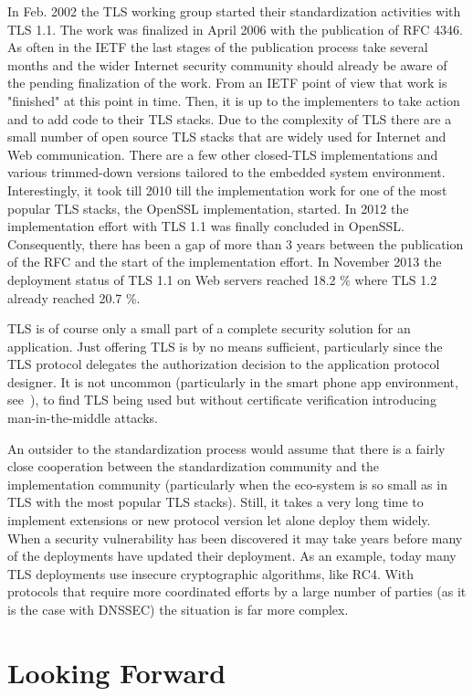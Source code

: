 \documentclass[peerreview, a4paper, 7pt]{IEEEtran}
\begin{document}
In Feb. 2002 the TLS working group started their standardization activities with TLS 1.1. The work was finalized in April 2006 with the publication of RFC 4346. As often in the IETF the last stages of the publication process take several months and the wider Internet security community should already be aware of the pending finalization of the work. From an IETF point of view that work is "finished" at this point in time. Then, it is up to the implementers to take action and to add code to their TLS stacks. Due to the complexity of TLS there are a small number of open source TLS stacks that are widely used for Internet and Web communication. There are a few other closed-TLS implementations and various trimmed-down versions tailored to the embedded system environment. Interestingly, it took till 2010 till the implementation work for one of the most popular TLS stacks, the OpenSSL implementation, started. In 2012 the implementation effort with TLS 1.1 was finally concluded in OpenSSL. Consequently, there has been a gap of more than 3 years between the publication of the RFC and the start of the implementation effort. In November 2013 the deployment status of TLS 1.1 on Web servers reached 18.2 \% where TLS 1.2 already reached 20.7 \%. 

TLS is of course only a small part of a complete security solution for an application. Just offering TLS is by no means sufficient, particularly since the TLS protocol delegates the authorization decision to the application protocol designer. It is not uncommon (particularly in the smart phone app environment, see~\cite{GI+02}), to find TLS being used but without certificate verification introducing man-in-the-middle attacks. 

An outsider to the standardization process would assume that there is a fairly close cooperation between the standardization community and the implementation community (particularly when the eco-system is so small as in TLS with the most popular TLS stacks). Still, it takes a very long time to implement extensions or new protocol version let alone deploy them widely. When a security vulnerability has been discovered it may take years before many of the deployments have updated their deployment. As an example, today many TLS deployments use insecure cryptographic algorithms, like RC4. With protocols that require more coordinated efforts by a large number of parties (as it is the case with DNSSEC) the situation is far more complex.  

\section{Looking Forward}
\end{document}
